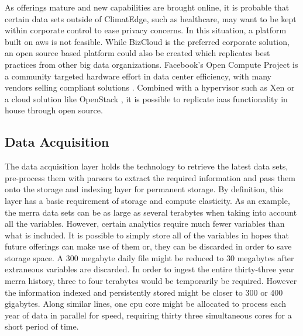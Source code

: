 As offerings mature and new capabilities are brought online, it is probable that certain data sets outside of ClimatEdge, such as healthcare, may want to be kept within corporate control to ease privacy concerns. In this situation, a platform built on \gls{aws} is not feasible. While BizCloud is the preferred corporate solution, an open source based platform could also be created which replicates best practices from other big data organizations. Facebook's Open Compute Project is a community targeted hardware effort in data center efficiency, with many vendors selling compliant solutions \cite{opencompute}. Combined with a hypervisor such as Xen \cite{xen} or a cloud solution like OpenStack \cite{openstack}, it is possible to replicate \gls{iaas} functionality in house through open source.
\subsection{Data Acquisition}
The data acquisition layer holds the technology to retrieve the latest data sets, pre-process them with parsers  to extract the required information and pass them onto the storage and indexing layer for permanent storage. By definition, this layer has a basic requirement of storage and compute elasticity. As an example, the \gls{merra} data sets can be as large as several terabytes when taking into account all the variables. However, certain analytics require much fewer variables than what is included. It is possible to simply store all of the variables in hopes that future offerings can make use of them or, they can be discarded in order to save storage space. A 300 megabyte daily file might be reduced to 30 megabytes after extraneous variables are discarded.  In order to ingest the entire thirty-three year \gls{merra} history, three to four terabytes would be temporarily be required. However the information indexed and persistently stored might be closer to 300 or 400 gigabytes. Along similar lines, one \gls{cpu} core might be allocated to process each year of data in parallel for speed, requiring thirty three simultaneous cores for a short period of time. \\

